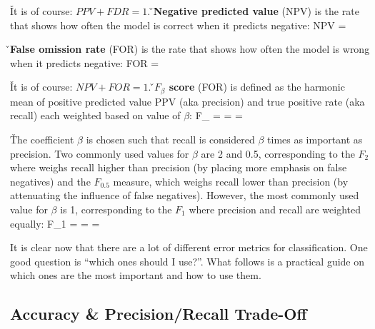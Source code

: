\v

It is of course: $PPV + FDR = 1$. \v

\textbf{Negative predicted value} (NPV) is the rate that shows how often the model is correct when it predicts negative:
\bse
NPV = 
\ese
\ed

\v

\textbf{False omission rate} (FOR) is the rate that shows how often the model is wrong when it predicts negative:
\bse
FOR = 
\ese
\ed

\v

It is of course: $NPV + FOR = 1$. \v

\textbf{$F_{\beta}$ score} (FOR) is defined as the harmonic mean of positive predicted value PPV (aka precision) and
true positive rate (aka recall) each weighted based on value of $\beta$:
\bse
F_{\beta} = 
= 
= 
\ese
\ed

\v

The coefficient $\beta$ is chosen such that recall is considered $\beta$ times as important as precision. Two
commonly used values for $\beta$ are 2 and 0.5, corresponding to the $F_{2}$ where weighs recall higher than
precision (by placing more emphasis on false negatives) and the $F_{0.5}$ measure, which weighs recall lower than
precision (by attenuating the influence of false negatives). However, the most commonly used value for $\beta$ is 1,
corresponding to the $F_{1}$ where precision and recall are weighted equally:
\bse
F_{1} =  =  = 
\ese

It is clear now that there are a lot of different error metrics for classification. One good question is ``which ones
should I use?''. What follows is a practical guide on which ones are the most important and how to use them.

\subsection{Accuracy \& Precision/Recall Trade-Off}

